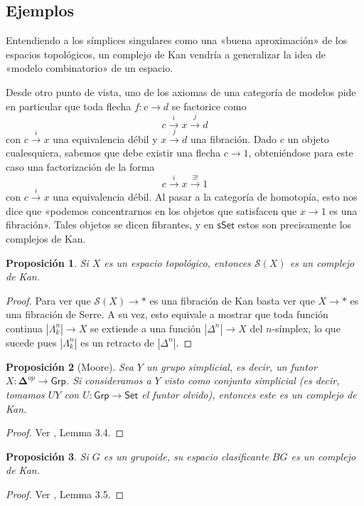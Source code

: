 \documentclass[11pt]{report}
\theoremstyle{colored}
\newtheorem{proposition}{Proposición}[section]
\newcommand{\cat}[1]{\mathsf{#1}}
\renewcommand{\ss}[1]{\Delta^{#1}}
\newcommand{\horn}[2]{\Lambda^{#1}_{#2}}
\newcommand{\ordcat}{\boldsymbol{\Delta}}
\newcommand{\guill}[1]{«#1»}
\begin{document}
\subsection{Ejemplos}

Entendiendo a los símplices singulares como una \guill{buena aproximación} de los espacios topológicos, un complejo de Kan vendría a generalizar la idea de \guill{modelo combinatorio} de un espacio. 

Desde otro punto de vista, uno de los axiomas de una categoría de modelos pide en particular que toda flecha $f : c \to d$ se factorice como
\[
c \xrightarrow{i} x \xrightarrow{j} d
\]
con $c \xrightarrow{i} x$ una equivalencia débil y $x \xrightarrow{j} d$ una fibración. Dado $c$ un objeto cualesquiera, sabemos que debe existir una flecha $c \to 1$, obteniéndose para este caso una factorización de la forma
\[
c \xrightarrow{i} x \xrightarrow{\exists!} 1
\]
con $c \xrightarrow{i} x$ una equivalencia débil. Al pasar a la categoría de homotopía, esto nos dice que \guill{podemos concentrarnos en los objetos que satisfacen que $x \to 1$ es una fibración}. Tales objetos se dicen fibrantes, y en $\cat{sSet}$ estos son precisamente los complejos de Kan.

\begin{proposition} Si $X$ es un espacio topológico, entonces $\mathcal{S}(X)$ es un complejo de Kan. 
\end{proposition}
\begin{proof} Para ver que $\mathcal{S}(X) \to \ast$ es una fibración de Kan basta ver que $X \to \ast$ es una fibración de Serre. A su vez, esto equivale a mostrar que toda función continua $|\horn{n}{k}| \to X$ se extiende a una función $|\ss{n}| \to X$ del $n$-símplex, lo que sucede pues $|\horn{n}{k}|$ es un retracto de $|\ss{n}|$.
\end{proof}

\begin{proposition}[Moore] Sea $Y$ un grupo simplicial, es decir, un funtor $X : \ordcat^{op} \to \cat{Grp}$. Si consideramos a $Y$ visto como conjunto simplicial (es decir, tomamos $UY$ con $U : \cat{Grp} \to \cat{Set}$ el funtor olvido), entonces este es un complejo de Kan.
\end{proposition}
\begin{proof} Ver \cite{GJ}, Lemma 3.4.
\end{proof}

\begin{proposition} Si $G$ es un grupoide, su espacio clasificante $BG$ es un complejo de Kan.
\end{proposition}
\begin{proof} Ver \cite{GJ}, Lemma 3.5.
\end{proof}
\end{document}

